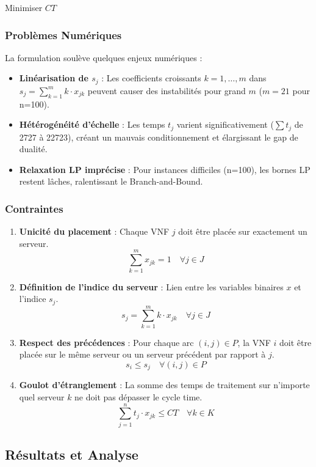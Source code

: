 \documentclass{article}
\begin{document}
Minimiser $CT$

\subsubsection{Problèmes Numériques}

La formulation soulève quelques enjeux numériques :
\begin{itemize}
    \item \textbf{Linéarisation de $s_j$} : Les coefficients croissants $k=1,\ldots,m$ dans $s_j = \sum_{k=1}^m k \cdot x_{jk}$ peuvent causer des instabilités pour grand $m$ ($m=21$ pour n=100).
    \item \textbf{Hétérogénéité d'échelle} : Les temps $t_j$ varient significativement ($\sum t_j$ de 2727 à 22723), créant un mauvais conditionnement et élargissant le gap de dualité.
    \item \textbf{Relaxation LP imprécise} : Pour instances difficiles (n=100), les bornes LP restent lâches, ralentissant le Branch-and-Bound.
\end{itemize}

\subsubsection{Contraintes}

\begin{enumerate}
    \item \textbf{Unicité du placement} : Chaque VNF $j$ doit être placée sur exactement un serveur.
    \[\sum_{k=1}^m x_{jk} = 1 \quad \forall j \in J\]

    \item \textbf{Définition de l'indice du serveur} : Lien entre les variables binaires $x$ et l'indice $s_j$.
    \[s_j = \sum_{k=1}^m k \cdot x_{jk} \quad \forall j \in J\]

    \item \textbf{Respect des précédences} : Pour chaque arc $(i, j) \in P$, la VNF $i$ doit être placée sur le même serveur ou un serveur précédent par rapport à $j$.
    \[s_i \le s_j \quad \forall (i, j) \in P\]

    \item \textbf{Goulot d'étranglement} : La somme des temps de traitement sur n'importe quel serveur $k$ ne doit pas dépasser le cycle time.
    \[\sum_{j=1}^n t_j \cdot x_{jk} \le CT \quad \forall k \in K\]
\end{enumerate}

\subsection{Résultats et Analyse}
\end{document}
